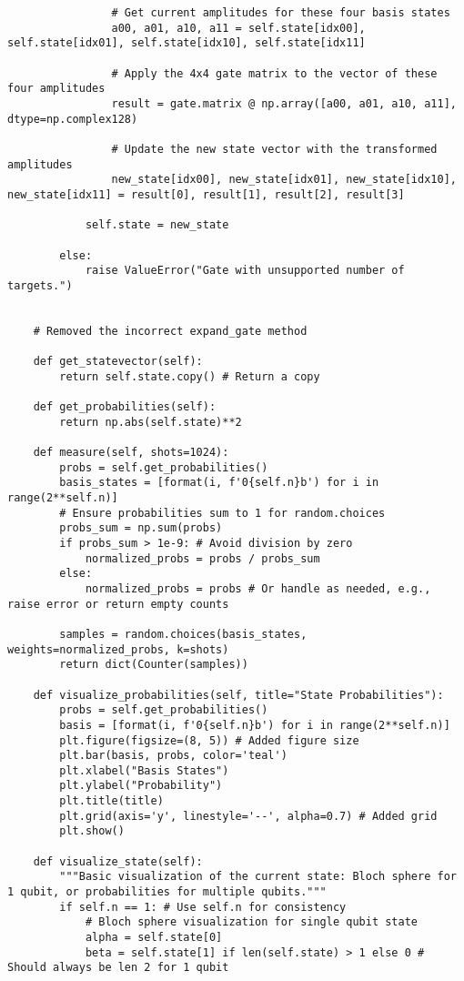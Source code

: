 \documentclass{beamer}
\begin{document}
\begin{frame}
\begin{verbatim}
                # Get current amplitudes for these four basis states
                a00, a01, a10, a11 = self.state[idx00], self.state[idx01], self.state[idx10], self.state[idx11]

                # Apply the 4x4 gate matrix to the vector of these four amplitudes
                result = gate.matrix @ np.array([a00, a01, a10, a11], dtype=np.complex128)

                # Update the new state vector with the transformed amplitudes
                new_state[idx00], new_state[idx01], new_state[idx10], new_state[idx11] = result[0], result[1], result[2], result[3]

            self.state = new_state

        else:
            raise ValueError("Gate with unsupported number of targets.")


    # Removed the incorrect expand_gate method

    def get_statevector(self):
        return self.state.copy() # Return a copy

    def get_probabilities(self):
        return np.abs(self.state)**2

    def measure(self, shots=1024):
        probs = self.get_probabilities()
        basis_states = [format(i, f'0{self.n}b') for i in range(2**self.n)]
        # Ensure probabilities sum to 1 for random.choices
        probs_sum = np.sum(probs)
        if probs_sum > 1e-9: # Avoid division by zero
            normalized_probs = probs / probs_sum
        else:
            normalized_probs = probs # Or handle as needed, e.g., raise error or return empty counts

        samples = random.choices(basis_states, weights=normalized_probs, k=shots)
        return dict(Counter(samples))

    def visualize_probabilities(self, title="State Probabilities"):
        probs = self.get_probabilities()
        basis = [format(i, f'0{self.n}b') for i in range(2**self.n)]
        plt.figure(figsize=(8, 5)) # Added figure size
        plt.bar(basis, probs, color='teal')
        plt.xlabel("Basis States")
        plt.ylabel("Probability")
        plt.title(title)
        plt.grid(axis='y', linestyle='--', alpha=0.7) # Added grid
        plt.show()

    def visualize_state(self):
        """Basic visualization of the current state: Bloch sphere for 1 qubit, or probabilities for multiple qubits."""
        if self.n == 1: # Use self.n for consistency
            # Bloch sphere visualization for single qubit state
            alpha = self.state[0]
            beta = self.state[1] if len(self.state) > 1 else 0 # Should always be len 2 for 1 qubit


\end{verbatim}
\end{frame}
\end{document}

